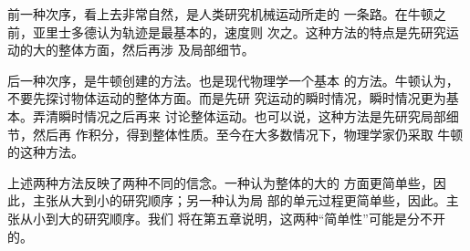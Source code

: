     前一种次序，看上去非常自然，是人类研究机械运动所走的
一条路。在牛顿之前，亚里士多德认为轨迹是最基本的，速度则
次之。这种方法的特点是先研究运动的大的整体方面，然后再涉
及局部细节。

    后一种次序，是牛顿创建的方法。也是现代物理学一个基本
的方法。牛顿认为，不要先探讨物体运动的整体方面。而是先研
究运动的瞬时情况，瞬时情况更为基本。弄清瞬时情况之后再来
讨论整体运动。也可以说，这种方法是先研究局部细节，然后再
作积分，得到整体性质。至今在大多数情况下，物理学家仍采取
牛顿的这种方法。

    上述两种方法反映了两种不同的信念。一种认为整体的大的
方面更简单些，因此，主张从大到小的研究顺序；另一种认为局
部的单元过程更简单些，因此。主张从小到大的研究顺序。我们
将在第五章说明，这两种“简单性”可能是分不开的。
